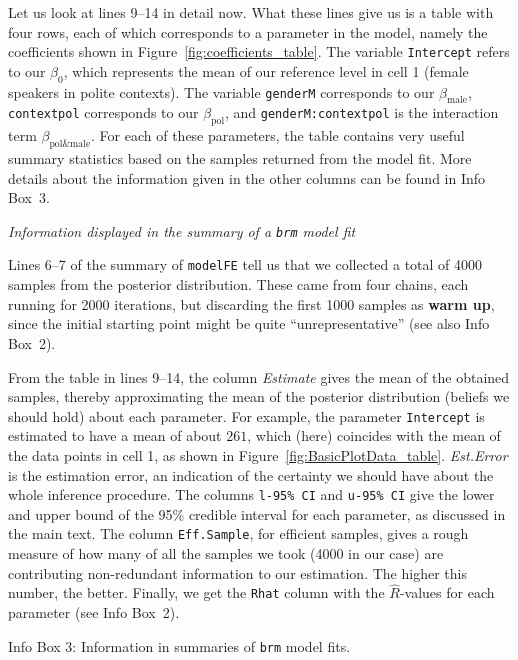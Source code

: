 \documentclass[nobib]{tufte-handout}
\begin{document}
Let us look at lines 9--14 in detail now. What these lines give us is a table with four rows, each of which corresponds to a parameter in the model, namely the coefficients shown in Figure~\ref{fig:coefficients_table}. The variable \texttt{Intercept} refers to our $\beta_0$, which represents the mean of our reference level in cell 1 (female speakers in polite contexts). The variable \texttt{genderM} corresponds to our $\beta_{\text{male}}$, \texttt{contextpol} corresponds to our $\beta_{\text{pol}}$, and \texttt{genderM:contextpol} is the interaction term $\beta_{\text{pol\&male}}$. For each of these parameters, the table contains very useful summary statistics based on the samples returned from the model fit.
%
%
More details about the information given in the other columns can be found in Info Box~3.

\begin{InfoBox}[t]
\centering
\colorbox{mygray}{\centering
  \begin{minipage}{1.0\textwidth}

    \emph{Information displayed in the summary of a \texttt{brm} model fit}
    \medskip

    Lines 6--7 of the summary of \texttt{modelFE} tell us that we collected a total of 4000 samples from the posterior distribution. These came from four chains, each running for 2000 iterations, but discarding the first 1000 samples as \textbf{warm up}, since the initial starting point might be quite ``unrepresentative'' (see also Info Box~2).
    
    From the table in lines 9--14, the column \emph{Estimate} gives the mean of the obtained
    samples, thereby approximating the mean of the posterior distribution (beliefs we should
    hold) about each parameter. For example, the parameter \texttt{Intercept} is estimated to
    have a mean of about $261$, which (here) coincides with the mean of the data points in cell
    1, as shown in Figure~\ref{fig:BasicPlotData_table}. \emph{Est.Error} is the estimation
    error, an indication of the certainty we should have about the whole inference procedure.
    The columns \texttt{l-95\% CI} and \texttt{u-95\% CI} give the lower and upper bound of the
    95\% credible interval for each parameter, as discussed in the main text. The column
    \texttt{Eff.Sample}, for efficient samples, gives a rough measure of how many of all the
    samples we took (4000 in our case) are contributing non-redundant information to our
    estimation. The higher this number, the better. Finally, we get the \texttt{Rhat} column with the $\hat{R}$-values for each parameter (see Info Box~2).
    
  \end{minipage} \par
  } \par
  \begin{center}
    Info Box 3: Information in summaries of \texttt{brm} model fits.
  \end{center}
\end{InfoBox}
\end{document}
